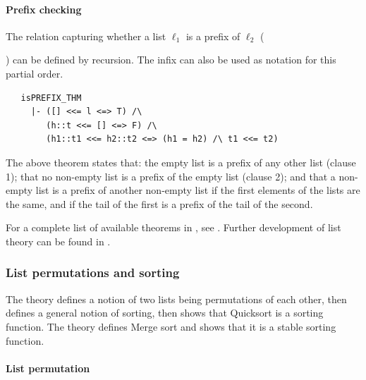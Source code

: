 \paragraph {Prefix checking}

The relation capturing whether a list $\ell_1$ is a prefix of $\ell_2$
({) can be defined by recursion. The infix
\holtxt{<{}<=} can also be used as notation for this partial order.
%
\begin{hol}
\begin{verbatim}
   isPREFIX_THM
     |- ([] <<= l <=> T) /\
        (h::t <<= [] <=> F) /\
        (h1::t1 <<= h2::t2 <=> (h1 = h2) /\ t1 <<= t2)
\end{verbatim}
\end{hol}
The above theorem states that: the empty list is a prefix of any other
list (clause 1); that no non-empty list is a prefix of the empty list
(clause 2); and that a non-empty list is a prefix of another non-empty
list if the first elements of the lists are the same, and if the tail
of the first is a prefix of the tail of the second.

\vspace{1ex}
\noindent For a complete list of available theorems in
, see \REFERENCE.  Further development of list
theory can be found in \theoryimp{rich\_list}.


\subsubsection{List permutations and sorting}

The \theoryimp{sorting} theory defines a notion of two lists being
permutations of each other, then defines a general notion of sorting,
then shows that Quicksort is a sorting function. The 
\theoryimp{mergesort} theory defines Merge sort and shows that it is a stable
sorting function.

\paragraph{List permutation}

}
